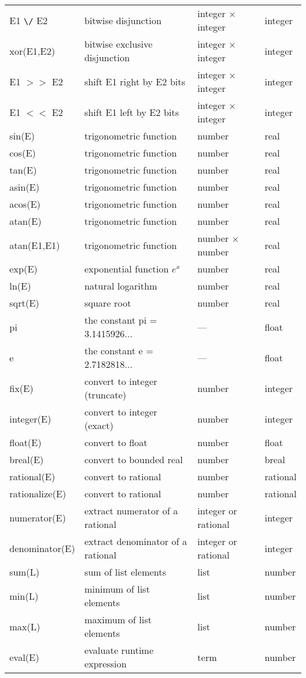 \begin{tabular}{l l l l}
E1 \verb$\/$ E2 & bitwise disjunction & integer $\times$ integer & integer \\
xor(E1,E2) & bitwise exclusive disjunction & integer $\times$ integer & integer \\
E1 $>>$ E2 & shift E1 right by E2 bits & integer $\times$ integer & integer \\
E1 $<<$ E2 & shift E1 left by E2 bits & integer $\times$ integer & integer \\
sin(E)     & trigonometric function & number & real \\
cos(E)     & trigonometric function & number & real \\
tan(E)     & trigonometric function & number & real \\
asin(E)    & trigonometric function & number & real \\
acos(E)    & trigonometric function & number & real \\
atan(E)    & trigonometric function & number & real \\
atan(E1,E1) & trigonometric function & number $\times$ number & real \\
exp(E)     & exponential function \( e^{x} \) & number & real \\
ln(E)      & natural logarithm & number & real \\
sqrt(E)    & square root & number & real \\
pi         & the constant pi = 3.1415926...  & --- & float \\
e          & the constant e = 2.7182818... & --- & float \\
fix(E)     & convert to integer (truncate) & number & integer \\
integer(E) & convert to integer (exact) & number & integer \\
float(E)   & convert to float & number & float \\
breal(E)   & convert to bounded real & number & breal \\
rational(E)   & convert to rational & number & rational \\
rationalize(E) & convert to rational & number & rational \\
numerator(E)   & extract numerator of a  rational & integer or rational & integer \\
denominator(E)   & extract denominator of a rational & integer or rational & integer \\
sum(L)   & sum of list elements & list & number \\
min(L)   & minimum of list elements & list & number \\
max(L)   & maximum of list elements & list & number \\
eval(E)   & evaluate runtime expression & term & number \\
\end{tabular}
\vspace{2mm}

